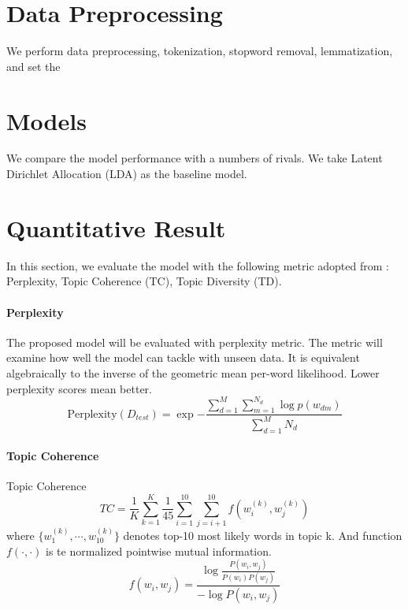 \section{Data Preprocessing}
We perform data preprocessing, tokenization, stopword removal, lemmatization, and set the 
\section{Models}
We compare the model performance with a numbers of rivals. We take Latent Dirichlet Allocation (LDA) as the baseline model.
\section{Quantitative Result}
In this section, we evaluate the model with the following metric adopted from \cite{dieng_dynamic_2019}: Perplexity, Topic Coherence (TC), Topic Diversity (TD). %
\paragraph{Perplexity}The proposed model will be evaluated with perplexity metric. The metric will examine how well the model can tackle with unseen data. It is equivalent algebraically to the inverse of the geometric mean per-word likelihood. Lower perplexity scores mean better.\begin{equation*}
\text{Perplexity}(D_{test})=\exp{{-\frac{\sum_{d=1}^{M}\sum_{m=1}^{N_d}\log p(w_{dm})}{\sum_{d=1}^{M}N_d}}}
\end{equation*}
\paragraph{Topic Coherence}Topic Coherence \cite{mimno_optimizing_2011}
\begin{equation*}
TC=\frac{1}{K}\sum_{k=1}^{K}\frac{1}{45}\sum_{i=1}^{10}\sum_{j=i+1}^{10}f(w_i^{(k)},w_j^{(k)})\end{equation*}
where $\{w_1^{(k)},\cdots,w_{10}^{(k)}\}$ denotes top-10 most likely words in topic k. And function $f(\cdot,\cdot)$ is te normalized pointwise mutual information.\begin{equation*}
f(w_i,w_j)=\frac{\log\frac{P(w_i,w_j)}{P(w_i)P(w_j)}}{-\log P(w_i,w_j)}\end{equation*}

